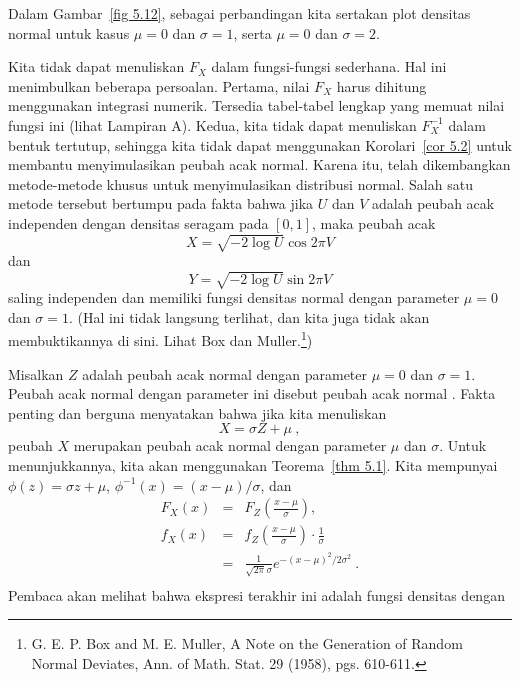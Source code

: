 Dalam Gambar~\ref{fig 5.12}, sebagai perbandingan kita sertakan plot densitas normal
untuk kasus $\mu = 0$ dan $\sigma = 1$, serta $\mu = 0$ dan $\sigma = 2$.


\par 
Kita tidak dapat menuliskan $F_X$ dalam fungsi-fungsi sederhana.  Hal ini menimbulkan
beberapa persoalan.  Pertama, nilai $F_X$ harus dihitung menggunakan integrasi
numerik.  Tersedia tabel-tabel lengkap yang memuat nilai fungsi ini (lihat Lampiran A).
Kedua, kita tidak dapat menuliskan $F^{-1}_X$ dalam bentuk tertutup, sehingga kita
tidak dapat menggunakan Korolari~\ref{cor 5.2} untuk membantu menyimulasikan peubah
acak normal.  Karena itu, telah dikembangkan metode-metode khusus untuk menyimulasikan
distribusi normal.  Salah satu metode tersebut bertumpu pada fakta bahwa jika $U$ dan
$V$ adalah peubah acak independen dengan densitas seragam pada $[0,1]$, maka peubah acak
$$  X = \sqrt{-2\log U} \cos 2\pi V
$$ dan
$$ Y = \sqrt{-2\log U} \sin 2\pi V
$$ saling independen dan memiliki fungsi densitas normal dengan parameter $\mu = 0$
dan $\sigma = 1$.  (Hal ini tidak langsung terlihat, dan kita juga tidak akan
membuktikannya di sini.  Lihat Box dan
Muller.\footnote{G. E. P. Box and M. E. Muller,  \emx
{A Note on the Generation of Random Normal Deviates}, Ann. of Math. Stat. 29 (1958), pgs.
610-611.})
\par Misalkan $Z$ adalah peubah acak normal dengan parameter $\mu = 0$ dan
$\sigma = 1$. Peubah acak normal dengan parameter ini disebut peubah acak normal
.  Fakta penting dan berguna menyatakan
bahwa jika kita menuliskan
$$X = \sigma Z + \mu\ ,$$
peubah $X$ merupakan peubah acak normal dengan parameter $\mu$ dan $\sigma$.  Untuk
menunjukkannya, kita akan menggunakan Teorema~\ref{thm 5.1}.  Kita mempunyai
$\phi(z) = \sigma z + \mu$,
$\phi^{-1}(x) = (x - \mu)/\sigma$, dan
\begin{eqnarray*} F_X(x) & = & F_Z\left(\frac {x - \mu}\sigma \right), \\ f_X(x) & = &
f_Z\left(\frac {x - \mu}\sigma \right) \cdot \frac 1\sigma \\
       & = & \frac 1{\sqrt{2\pi}\sigma} e^{-(x - \mu)^2/2\sigma^2}\ . \\
\end{eqnarray*}
Pembaca akan melihat bahwa ekspresi terakhir ini adalah fungsi densitas dengan
